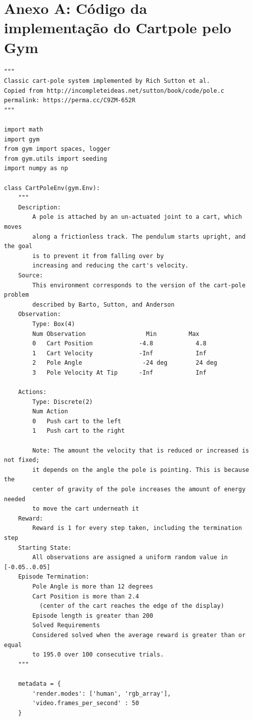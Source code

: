 \documentclass[cic,tc]{iiufrgs}
\newenvironment{longlisting}{\captionsetup{type=listing}}{}
\begin{document}
\chapter*{Anexo A: Código da implementação do Cartpole pelo Gym}
\begin{longlisting}
\begin{verbatim}
"""
Classic cart-pole system implemented by Rich Sutton et al.
Copied from http://incompleteideas.net/sutton/book/code/pole.c
permalink: https://perma.cc/C9ZM-652R
"""

import math
import gym
from gym import spaces, logger
from gym.utils import seeding
import numpy as np

class CartPoleEnv(gym.Env):
    """
    Description:
        A pole is attached by an un-actuated joint to a cart, which moves
        along a frictionless track. The pendulum starts upright, and the goal
        is to prevent it from falling over by
        increasing and reducing the cart's velocity.
    Source:
        This environment corresponds to the version of the cart-pole problem
        described by Barto, Sutton, and Anderson
    Observation:
        Type: Box(4)
        Num	Observation                 Min         Max
        0	Cart Position             -4.8            4.8
        1	Cart Velocity             -Inf            Inf
        2	Pole Angle                 -24 deg        24 deg
        3	Pole Velocity At Tip      -Inf            Inf

    Actions:
        Type: Discrete(2)
        Num	Action
        0	Push cart to the left
        1	Push cart to the right

        Note: The amount the velocity that is reduced or increased is not fixed;
        it depends on the angle the pole is pointing. This is because the
        center of gravity of the pole increases the amount of energy needed
        to move the cart underneath it
    Reward:
        Reward is 1 for every step taken, including the termination step
    Starting State:
        All observations are assigned a uniform random value in [-0.05..0.05]
    Episode Termination:
        Pole Angle is more than 12 degrees
        Cart Position is more than 2.4
          (center of the cart reaches the edge of the display)
        Episode length is greater than 200
        Solved Requirements
        Considered solved when the average reward is greater than or equal
        to 195.0 over 100 consecutive trials.
    """

    metadata = {
        'render.modes': ['human', 'rgb_array'],
        'video.frames_per_second' : 50
    }


\end{verbatim}
\end{longlisting}
\end{document}
